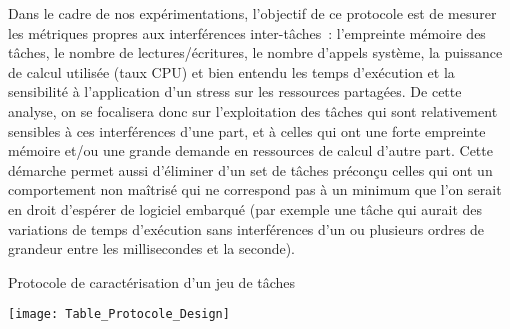\documentclass[french, a4paper, 11pt, twoside, pdftex]{StyleThese}
\begin{document}
        Dans le cadre de nos expérimentations, l'objectif de ce protocole est de mesurer les métriques propres aux interférences inter-tâches~: l'empreinte mémoire des tâches, le nombre de lectures/écritures, le nombre d'appels système, la puissance de calcul utilisée (taux CPU) et bien entendu les temps d'exécution et la sensibilité à l'application d'un stress sur les ressources partagées. De cette analyse, on se focalisera donc sur l'exploitation des tâches qui sont relativement sensibles à ces interférences d'une part, et à celles qui ont une forte empreinte mémoire et/ou une grande demande en ressources de calcul d'autre part. Cette démarche permet aussi d'éliminer d'un set de tâches préconçu celles qui ont un comportement non maîtrisé qui ne correspond pas à un minimum que l'on serait en droit d'espérer de logiciel embarqué (par exemple une tâche qui aurait des variations de temps d'exécution sans interférences d'un ou plusieurs ordres de grandeur entre les millisecondes et la seconde).
        
        \begin{table}[ht]
        	\centering
        	\caption{Protocole de caractérisation d'un jeu de tâches}
        	\label{tab:tableprotocoledesign}
        	\texttt{[image: Table\_Protocole\_Design]}
        \end{table}
             
\end{document}
